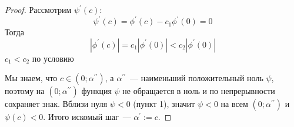 \begin{proof}
  Рассмотрим $\psi^{\prime}(c)$:
  \[
  \psi^{\prime}(c) = \phi^{\prime}(c) - c_1\phi^{\prime}(0) = 0
  \]
  Тогда
  \[| \phi^{\prime}(c) | = c_1 | \phi^{\prime}(0) | < c_2 | \phi^{\prime}(0) |
  \]
  $c_1 < c_2$ по условию

  Мы знаем, что $c \in (0; \alpha^{\prime\prime})$, а $\alpha^{\prime\prime}$~--- наименьший положительный ноль $\psi$, поэтому на $(0;\alpha^{\prime\prime})$ функция $\psi$ не обращается в ноль и по непрерывности сохраняет знак. Вблизи нуля $\psi < 0$ (пункт 1), значит $\psi < 0$ на всем $(0;\alpha^{\prime\prime})$ и $\psi(c) < 0$. Итого искомый шаг~--- $\alpha^{\prime} := c$.
\end{proof}
